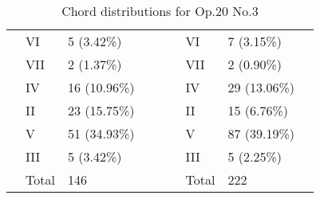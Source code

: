 \begin{table}[]
{\begin{tabular}{|l|l|l|l|l|l|l|l|l|}
 & VI & 5 (3.42\%) &  &  &  & VI & 7 (3.15\%) &  \\ \cline{2-3} \cline{7-8}
 & VII & 2 (1.37\%) &  &  &  & VII & 2 (0.90\%) &  \\ \cline{2-3} \cline{7-8}
 & IV & 16 (10.96\%) &  &  &  & IV & 29 (13.06\%) &  \\ \cline{2-3} \cline{7-8}
 & II & 23 (15.75\%) &  &  &  & II & 15 (6.76\%) &  \\ \cline{2-3} \cline{7-8}
 & V & 51 (34.93\%) &  &  &  & V & 87 (39.19\%) &  \\ \cline{2-3} \cline{7-8}
 & III & 5 (3.42\%) &  &  &  & III & 5 (2.25\%) &  \\ \cline{2-3} \cline{7-8}
 & Total & 146 &  &  &  & Total & 222 &  \\ \cline{1-4} \cline{6-9}
\end{tabular}
}
\caption{Chord distributions for Op.20 No.3}
\label{table:chords_op20n3}
\end{table}

